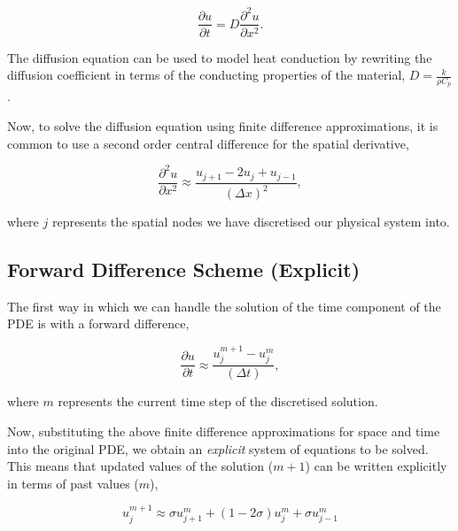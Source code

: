 \documentclass[12pt]{article}
\begin{document}
\vspace{2mm}

$$ \frac{\partial u}{\partial t} = D \frac{\partial^2u}{\partial x^2}. $$
	
\vspace{4mm}	
	
The diffusion equation can be used to model heat conduction by rewriting the diffusion coefficient in terms of the conducting properties of the material, $D=\frac{k}{\rho C_p}$.

\vspace{4mm}

Now, to solve the diffusion equation using finite difference approximations, it is common to use a second order central difference for the spatial derivative,

\vspace{2mm}

$$ \frac{\partial^2u}{\partial x^2} \approx \frac{u_{j+1} - 2u_j + u_{j-1}}{(\Delta x)^2}, $$

\vspace{4mm}
	
where $j$ represents the spatial nodes we have discretised our physical system into.

\subsection{Forward Difference Scheme (Explicit)}

The first way in which we can handle the solution of the time component of the PDE is with a forward difference,

\vspace{2mm}

$$ \frac{\partial u}{\partial t} \approx \frac{u_j^{m+1} - u_j^m}{(\Delta t)}, $$

\vspace{4mm}

where $m$ represents the current time step of the discretised solution.

\vspace{4mm}

Now, substituting the above finite difference approximations for space and time into the original PDE, we obtain an {\it explicit} system of equations to be solved. This means that updated values  of the solution ($m+1$) can be written explicitly in terms of past values ($m$),

$$ u_{j}^{m+1} \approx \sigma u_{j+1}^{m} + (1-2\sigma)u_{j}^{m} + \sigma u_{j-1}^{m} $$
\end{document}
